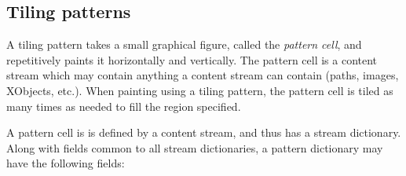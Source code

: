\subsection{Tiling patterns}

A tiling pattern takes a small graphical figure, called the {\it pattern cell}, and repetitively paints it
horizontally and vertically.
The pattern cell is a content stream which may contain anything a content stream can contain (paths, images,
XObjects, etc.).
When painting using a tiling pattern, the pattern cell is tiled as many times as needed to fill the region
specified.

A pattern cell is is defined by a content stream, and thus has a stream dictionary.
Along with fields common to all stream dictionaries, a pattern dictionary may have the following fields:

